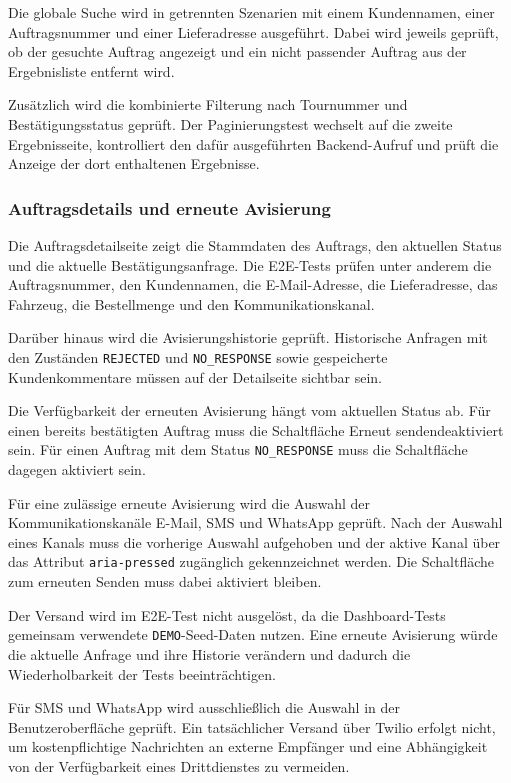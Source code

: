 Die globale Suche wird in getrennten Szenarien mit einem
Kundennamen, einer Auftragsnummer und einer Lieferadresse
ausgeführt. Dabei wird jeweils geprüft, ob der gesuchte Auftrag
angezeigt und ein nicht passender Auftrag aus der Ergebnisliste
entfernt wird.

Zusätzlich wird die kombinierte Filterung nach Tournummer und
Bestätigungsstatus geprüft. Der Paginierungstest wechselt auf die
zweite Ergebnisseite, kontrolliert den dafür ausgeführten
Backend-Aufruf und prüft die Anzeige der dort enthaltenen
Ergebnisse.

\subsubsection{Auftragsdetails und erneute Avisierung}

Die Auftragsdetailseite zeigt die Stammdaten des Auftrags, den
aktuellen Status und die aktuelle Bestätigungsanfrage. Die
E2E-Tests prüfen unter anderem die Auftragsnummer, den
Kundennamen, die E-Mail-Adresse, die Lieferadresse, das Fahrzeug,
die Bestellmenge und den Kommunikationskanal.

Darüber hinaus wird die Avisierungshistorie geprüft. Historische
Anfragen mit den Zuständen \texttt{REJECTED} und
\texttt{NO\_RESPONSE} sowie gespeicherte Kundenkommentare müssen
auf der Detailseite sichtbar sein.

Die Verfügbarkeit der erneuten Avisierung hängt vom aktuellen
Status ab. Für einen bereits bestätigten Auftrag muss die
Schaltfläche
\glqq Erneut senden\grqq deaktiviert sein. Für einen Auftrag mit
dem Status \texttt{NO\_RESPONSE} muss die Schaltfläche dagegen
aktiviert sein.

Für eine zulässige erneute Avisierung wird die Auswahl der
Kommunikationskanäle E-Mail, SMS und WhatsApp geprüft. Nach der
Auswahl eines Kanals muss die vorherige Auswahl aufgehoben und
der aktive Kanal über das Attribut \texttt{aria-pressed}
zugänglich gekennzeichnet werden. Die Schaltfläche zum erneuten
Senden muss dabei aktiviert bleiben.

Der Versand wird im E2E-Test nicht ausgelöst, da die
Dashboard-Tests gemeinsam verwendete \texttt{DEMO}-Seed-Daten
nutzen. Eine erneute Avisierung würde die aktuelle Anfrage und
ihre Historie verändern und dadurch die Wiederholbarkeit der
Tests beeinträchtigen.

Für SMS und WhatsApp wird ausschließlich die Auswahl in der
Benutzeroberfläche geprüft. Ein tatsächlicher Versand über
Twilio erfolgt nicht, um kostenpflichtige Nachrichten an externe
Empfänger und eine Abhängigkeit von der Verfügbarkeit eines
Drittdienstes zu vermeiden.

